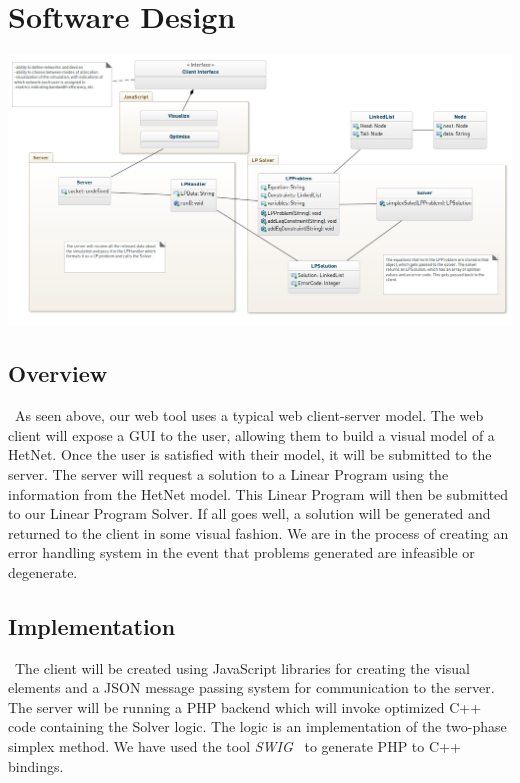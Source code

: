 \documentclass[11pt]{article}
\begin{document}
\section{Software Design}

\begin{center}
\includegraphics[width=600px, angle=270]{model.png}
\end{center}

\subsection{Overview}
~\indent As seen above, our web tool uses a typical web client-server model. The web client
will expose a GUI to the user, allowing them to build a visual model of a 
HetNet. Once the user is satisfied with their model, it will be submitted to the 
server. The server will request a solution to a Linear Program using the information 
from the HetNet model. This Linear Program will then be submitted to our Linear
Program Solver. If all goes well, a solution will be generated and returned to 
the client in some visual fashion. We are in the process of creating an 
error handling system in the event that problems generated are infeasible or 
degenerate. 

\subsection{Implementation}
~\indent The client will be created using JavaScript libraries for creating the visual 
elements and a JSON message passing system for communication to the server.
The server will be running a PHP backend which will invoke optimized
C++ code containing the Solver logic. The logic is an implementation of the two-phase
simplex method. We have used the tool \textit{SWIG}~\cite{swig} to generate  
PHP to C++ bindings. 
\end{document}

